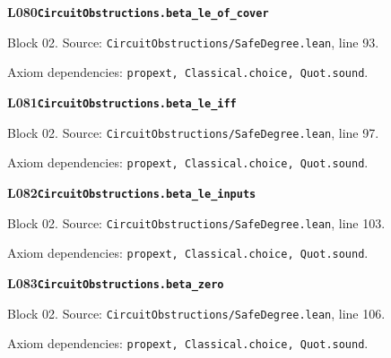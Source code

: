 \begin{minipage}{\linewidth}
\hypertarget{L080}{}
{\small\sffamily\bfseries\color{ink}L080\quad\nolinkurl{CircuitObstructions.beta_le_of_cover}}\par
{\scriptsize\sffamily\color{muted}Block 02. Source: \nolinkurl{CircuitObstructions/SafeDegree.lean}, line 93.}\par
{}
{\scriptsize\sffamily\color{muted}Axiom dependencies: \nolinkurl{propext, Classical.choice, Quot.sound}.}
\end{minipage}\par\medskip
\begin{minipage}{\linewidth}
\hypertarget{L081}{}
{\small\sffamily\bfseries\color{ink}L081\quad\nolinkurl{CircuitObstructions.beta_le_iff}}\par
{\scriptsize\sffamily\color{muted}Block 02. Source: \nolinkurl{CircuitObstructions/SafeDegree.lean}, line 97.}\par
{}
{\scriptsize\sffamily\color{muted}Axiom dependencies: \nolinkurl{propext, Classical.choice, Quot.sound}.}
\end{minipage}\par\medskip
\begin{minipage}{\linewidth}
\hypertarget{L082}{}
{\small\sffamily\bfseries\color{ink}L082\quad\nolinkurl{CircuitObstructions.beta_le_inputs}}\par
{\scriptsize\sffamily\color{muted}Block 02. Source: \nolinkurl{CircuitObstructions/SafeDegree.lean}, line 103.}\par
{}
{\scriptsize\sffamily\color{muted}Axiom dependencies: \nolinkurl{propext, Classical.choice, Quot.sound}.}
\end{minipage}\par\medskip
\begin{minipage}{\linewidth}
\hypertarget{L083}{}
{\small\sffamily\bfseries\color{ink}L083\quad\nolinkurl{CircuitObstructions.beta_zero}}\par
{\scriptsize\sffamily\color{muted}Block 02. Source: \nolinkurl{CircuitObstructions/SafeDegree.lean}, line 106.}\par
{}
{\scriptsize\sffamily\color{muted}Axiom dependencies: \nolinkurl{propext, Classical.choice, Quot.sound}.}
\end{minipage}\par\medskip
